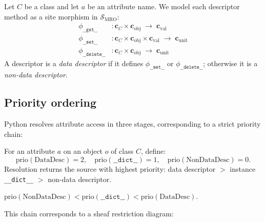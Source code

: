 \documentclass[11pt]{article}
\newcommand{\MROSite}{\mathcal{S}_{\mathrm{MRO}}} %
\newcommand{\ClassCoord}[1]{\mathbf{c}_{#1}}      %
\newcommand{\Dget}{\texttt{\_\_get\_\_}}
\newcommand{\Dset}{\texttt{\_\_set\_\_}}
\newcommand{\Ddel}{\texttt{\_\_delete\_\_}}
\newcommand{\DescData}{\mathrm{DataDesc}}
\newcommand{\DescND}{\mathrm{NonDataDesc}}
\newcommand{\InstDict}{\texttt{\_\_dict\_\_}}
\newcommand{\DescMor}[1]{\phi_{#1}}               %
\newcommand{\prio}[1]{\mathrm{prio}(#1)}
\newcommand{\prioData}{2}
\newcommand{\prioInst}{1}
\newcommand{\prioND}{0}
\begin{document}
\begin{definition}\label{def:desc-mor}
  Let $C$ be a class and let $a$ be an attribute name.
  We model each descriptor method as a site morphism in $\MROSite$:
  \begin{align*}
    \DescMor{\Dget}    &\colon \ClassCoord{C} \times \ClassCoord{\mathrm{obj}}
                        \;\longrightarrow\; \ClassCoord{\mathrm{val}} \\
    \DescMor{\Dset}    &\colon \ClassCoord{C} \times \ClassCoord{\mathrm{obj}}
                        \times \ClassCoord{\mathrm{val}}
                        \;\longrightarrow\; \ClassCoord{\mathrm{unit}} \\
    \DescMor{\Ddel}    &\colon \ClassCoord{C} \times \ClassCoord{\mathrm{obj}}
                        \;\longrightarrow\; \ClassCoord{\mathrm{unit}}
  \end{align*}
  A descriptor is a \emph{data descriptor} if it defines $\DescMor{\Dset}$
  or $\DescMor{\Ddel}$; otherwise it is a \emph{non-data descriptor}.
\end{definition}

\subsection{Priority ordering}

Python resolves attribute access in three stages, corresponding to a
strict priority chain:

\begin{definition}\label{def:desc-priority}
  For an attribute $a$ on an object $o$ of class $C$, define:
  \[
    \prio{\DescData} = \prioData,\quad
    \prio{\InstDict}    = \prioInst,\quad
    \prio{\DescND}  = \prioND.
  \]
  Resolution returns the source with highest priority:
  data descriptor $>$ instance \InstDict{} $>$ non-data descriptor.
\end{definition}

\begin{proposition}\label{prop:desc-priority}
  $\prio{\DescND} < \prio{\InstDict} < \prio{\DescData}$.
\end{proposition}

This chain corresponds to a sheaf restriction diagram:
\end{document}
